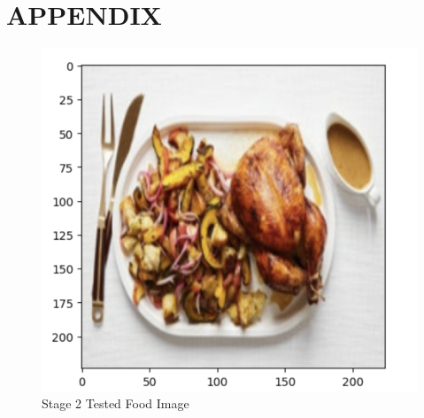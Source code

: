 \documentclass[10pt,twocolumn,letterpaper]{article}
\begin{document}
\appendix
\section{APPENDIX}




\begin{figure}[ht]
\begin{center}
   \includegraphics[width=0.8\linewidth]{chicken.png}
\end{center}
\caption{Stage 2 Tested Food Image}
\label{fig:onecol}
\end{figure}

\end{document}
